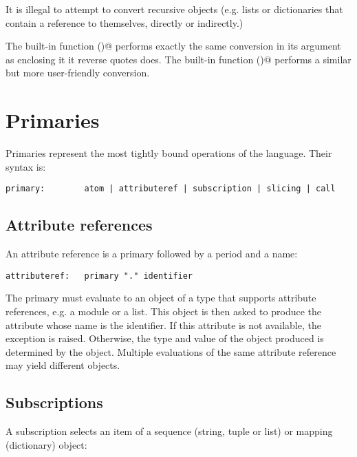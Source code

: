 It is illegal to attempt to convert recursive objects (e.g. lists or
dictionaries that contain a reference to themselves, directly or
indirectly.)

The built-in function \verb@repr()@ performs exactly the same
conversion in its argument as enclosing it it reverse quotes does.
The built-in function \verb@str()@ performs a similar but more
user-friendly conversion.

\section{Primaries} \label{primaries}

Primaries represent the most tightly bound operations of the language.
Their syntax is:

\begin{verbatim}
primary:        atom | attributeref | subscription | slicing | call
\end{verbatim}

\subsection{Attribute references}

An attribute reference is a primary followed by a period and a name:

\begin{verbatim}
attributeref:   primary "." identifier
\end{verbatim}

The primary must evaluate to an object of a type that supports
attribute references, e.g. a module or a list.  This object is then
asked to produce the attribute whose name is the identifier.  If this
attribute is not available, the exception \verb@AttributeError@ is
raised.  Otherwise, the type and value of the object produced is
determined by the object.  Multiple evaluations of the same attribute
reference may yield different objects.

\subsection{Subscriptions}

A subscription selects an item of a sequence (string, tuple or list)
or mapping (dictionary) object:

